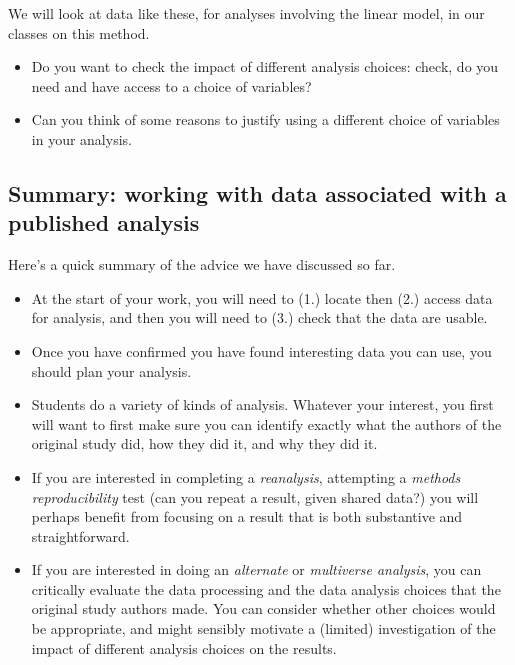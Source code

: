 \documentclass[
  letterpaper,
  DIV=11,
  numbers=noendperiod]{scrreprt}
\providecommand{\tightlist}{%
  \setlength{\itemsep}{0pt}\setlength{\parskip}{0pt}}\usepackage{longtable,booktabs,array}
\begin{document}
We will look at data like these, for analyses involving the linear
model, in our classes on this method.

\begin{tcolorbox}[enhanced jigsaw, opacitybacktitle=0.6, title=\textcolor{quarto-callout-tip-color}{\faLightbulb}\hspace{0.5em}{Tip}, arc=.35mm, colbacktitle=quarto-callout-tip-color!10!white, colframe=quarto-callout-tip-color-frame, leftrule=.75mm, opacityback=0, breakable, titlerule=0mm, left=2mm, bottomrule=.15mm, toprule=.15mm, colback=white, coltitle=black, bottomtitle=1mm, toptitle=1mm, rightrule=.15mm]

\begin{itemize}
\tightlist
\item
  Do you want to check the impact of different analysis choices: check,
  do you need and have access to a choice of variables?
\item
  Can you think of some reasons to justify using a different choice of
  variables in your analysis.
\end{itemize}

\end{tcolorbox}

\hypertarget{sec-published-analyses-summary}{%
\subsection{Summary: working with data associated with a published
analysis}\label{sec-published-analyses-summary}}

Here's a quick summary of the advice we have discussed so far.

\begin{itemize}
\tightlist
\item
  At the start of your work, you will need to (1.) locate then (2.)
  access data for analysis, and then you will need to (3.) check that
  the data are usable.
\item
  Once you have confirmed you have found interesting data you can use,
  you should plan your analysis.
\item
  Students do a variety of kinds of analysis. Whatever your interest,
  you first will want to first make sure you can identify exactly what
  the authors of the original study did, how they did it, and why they
  did it.
\item
  If you are interested in completing a \emph{reanalysis}, attempting a
  \emph{methods reproducibility} test (can you repeat a result, given
  shared data?) you will perhaps benefit from focusing on a result that
  is both substantive and straightforward.
\item
  If you are interested in doing an \emph{alternate} or \emph{multiverse
  analysis}, you can critically evaluate the data processing and the
  data analysis choices that the original study authors made. You can
  consider whether other choices would be appropriate, and might
  sensibly motivate a (limited) investigation of the impact of different
  analysis choices on the results.
\end{itemize}
\end{document}
